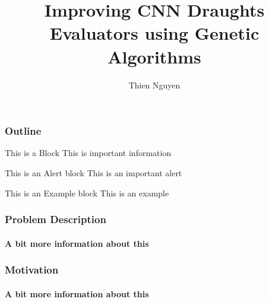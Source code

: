 \documentclass{beamer}
\begin{document}
\title[CNN and GA To Play Draughts] %
{Improving CNN Draughts Evaluators using Genetic Algorithms}
\author[T. Nguyen] %
{Thien Nguyen}
\subject{Computer Science}

\frame{\titlepage}

\begin{frame}
  \frametitle{Outline}
    \begin{block}{This is a Block}
        This is important information
     \end{block}
  
     \begin{alertblock}{This is an Alert block}
     This is an important alert
     \end{alertblock}
  
     \begin{exampleblock}{This is an Example block}
     This is an example 
     \end{exampleblock}
\end{frame}

\begin{frame}
  \frametitle{Problem Description}
  \framesubtitle{A bit more information about this}
\end{frame}

\begin{frame}
    \frametitle{Motivation}
    \framesubtitle{A bit more information about this}
\end{frame}
\end{document}
